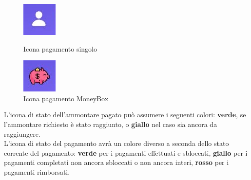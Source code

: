                 \begin{figure}[H]
                    \centering
                    \begin{minipage}{0.45\textwidth}
                        \centering
                        \includegraphics[scale=1]{immagini/uomo.jpg} 
                        \caption{Icona pagamento singolo}
                    \end{minipage}\hfill
                    \begin{minipage}{0.45\textwidth}
                    \centering
                        \includegraphics[scale=1]{immagini/piggy.jpg} 
                        \caption{Icona pagamento MoneyBox}
                    \end{minipage}
                \end{figure}

                L'icona di stato dell'ammontare pagato può assumere i seguenti colori: \textbf{verde}, se l'ammontare richiesto è stato raggiunto, o \textbf{giallo} nel caso sia ancora da raggiungere.\\

                L'icona di stato del pagamento avrà un colore diverso a seconda dello stato corrente del pagamento: \textbf{verde} per i pagamenti effettuati e sbloccati, 
                \textbf{giallo} per i pagamenti completati non ancora sbloccati o non ancora interi, \textbf{rosso} per i pagamenti rimborsati.

